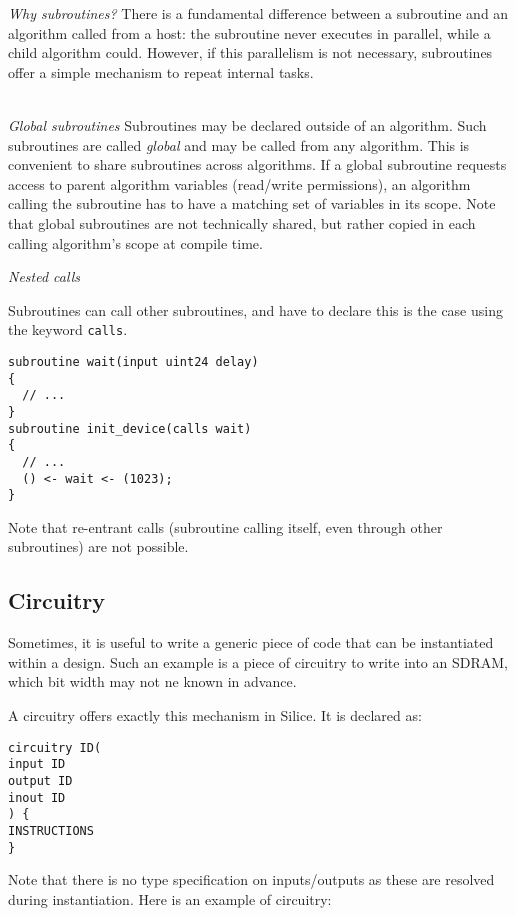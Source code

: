 \documentclass[a4]{article}
\newcommand\silice{Silice}
\begin{document}
\noindent \textit{Why subroutines?} There is a fundamental difference between a subroutine and an algorithm called from 
a host: the subroutine never executes in parallel, while a child algorithm could. However, if this parallelism is not necessary, 
subroutines offer a simple mechanism to repeat internal tasks.\\~

\noindent \textit{Global subroutines} Subroutines may be declared outside of an algorithm. Such subroutines are called \textit{global} and may be called from any algorithm. This is convenient to share subroutines across algorithms. If a global subroutine requests access to parent algorithm variables (read/write permissions), an algorithm calling the subroutine has to have a matching set of variables in its scope. Note that global subroutines are not technically shared, but rather copied in each calling algorithm's scope at compile time.

\noindent \textit{Nested calls}

Subroutines can call other subroutines, and have to declare this is the case using the keyword \texttt{calls}.

\begin{verbatim}
subroutine wait(input uint24 delay)
{
  // ...
}
subroutine init_device(calls wait)
{
  // ...
  () <- wait <- (1023);
}
\end{verbatim}

Note that re-entrant calls (subroutine calling itself, even through other subroutines) are not possible.


\subsection{Circuitry}

Sometimes, it is useful to write a generic piece of code that can
be instantiated within a design. Such an example is a piece of circuitry
to write into an SDRAM, which bit width may not ne known in advance.

A circuitry offers exactly this mechanism in \silice{}. It is declared as:

\begin{verbatim}
circuitry ID(
input ID
output ID
inout ID
) {
INSTRUCTIONS
}
\end{verbatim}

Note that there is no type specification on inputs/outputs as these are resolved during instantiation. Here is an example of circuitry:
\end{document}
